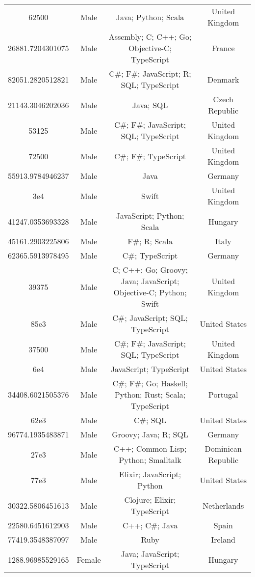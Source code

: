 \begin{center}
\begin{tabular}{ |c|c|c|c| }
62500  &  Male  &  Java; Python; Scala  &  United Kingdom  \\ 
26881.7204301075  &  Male  &  Assembly; C; C++; Go; Objective-C; TypeScript  &  France  \\ 
82051.2820512821  &  Male  &  C\#; F\#; JavaScript; R; SQL; TypeScript  &  Denmark  \\ 
21143.3046202036  &  Male  &  Java; SQL  &  Czech Republic  \\ 
53125  &  Male  &  C\#; F\#; JavaScript; SQL; TypeScript  &  United Kingdom  \\ 
72500  &  Male  &  C\#; F\#; TypeScript  &  United Kingdom  \\ 
55913.9784946237  &  Male  &  Java  &  Germany  \\ 
3e4  &  Male  &  Swift  &  United Kingdom  \\ 
41247.0353693328  &  Male  &  JavaScript; Python; Scala  &  Hungary  \\ 
45161.2903225806  &  Male  &  F\#; R; Scala  &  Italy  \\ 
62365.5913978495  &  Male  &  C\#; TypeScript  &  Germany  \\ 
39375  &  Male  &  C; C++; Go; Groovy; Java; JavaScript; Objective-C; Python; Swift  &  United Kingdom  \\ 
85e3  &  Male  &  C\#; JavaScript; SQL; TypeScript  &  United States  \\ 
37500  &  Male  &  C\#; F\#; JavaScript; SQL; TypeScript  &  United Kingdom  \\ 
6e4  &  Male  &  JavaScript; TypeScript  &  United States  \\ 
34408.6021505376  &  Male  &  C\#; F\#; Go; Haskell; Python; Rust; Scala; TypeScript  &  Portugal  \\ 
62e3  &  Male  &  C\#; SQL  &  United States  \\ 
96774.1935483871  &  Male  &  Groovy; Java; R; SQL  &  Germany  \\ 
27e3  &  Male  &  C++; Common Lisp; Python; Smalltalk  &  Dominican Republic  \\ 
77e3  &  Male  &  Elixir; JavaScript; Python  &  United States  \\ 
30322.5806451613  &  Male  &  Clojure; Elixir; TypeScript  &  Netherlands  \\ 
22580.6451612903  &  Male  &  C++; C\#; Java  &  Spain  \\ 
77419.3548387097  &  Male  &  Ruby  &  Ireland  \\ 
1288.96985529165  &  Female  &  Java; JavaScript; TypeScript  &  Hungary  \\ 

\end{tabular}
\end{center}
